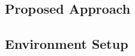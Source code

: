\documentclass[../report.tex]{subfiles}
\begin{document}
\subsection{Proposed Approach}




\subsection{Environment Setup}

\end{document}
